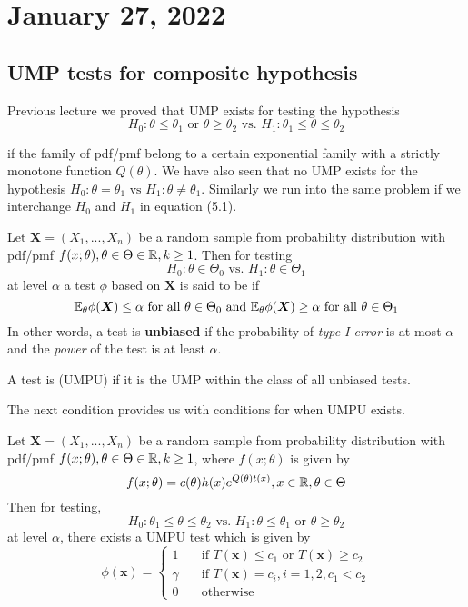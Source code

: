 \section{January 27, 2022}
\subsection{UMP tests for composite hypothesis}
Previous lecture we proved that UMP exists for testing the hypothesis 
\begin{equation}
    H_0: \theta \leq \theta_1 
    \text{ or } \theta \geq \theta_2
    \text{ vs. } H_1: \theta_1 \leq \theta \leq \theta_2
\end{equation}


if the family of pdf/pmf belong to a certain exponential family with a strictly monotone function $Q(\theta)$. 
We have also seen that no UMP exists for the hypothesis
$
H_0: \theta = \theta_1 \text{ vs }
H_1: \theta \neq \theta_1
$. 
Similarly we run into the same problem if we interchange $H_0$ and $H_1$ in equation (5.1).

\begin{definition}
Let $\boldsymbol{X} = (X_1,...,X_n)$ be a random sample from probability distribution with pdf/pmf $f(x;\theta), \theta \in \Theta \in \mathbb R, k \geq 1$. Then for testing
$$
H_0: \theta \in \Theta_0 \text{ vs. }
H_1: \theta \in \Theta_1
$$
at level $\alpha$ a test $\phi$ based on $\boldsymbol{X}$ is said to be  if
$$
\mathbb E_{\theta}\phi(\boldsymbol{X}) \leq \alpha \text{ for all } \theta \in \Theta_0
\text{ and }
\mathbb E_{\theta}\phi(\boldsymbol{X}) \geq \alpha \text{ for all } \theta \in \Theta_1
$$
In other words, a test is \textbf{unbiased} if the probability of \textit{type I error} is at most $\alpha$ and the \textit{power} of the test  is at least $\alpha$. 
\end{definition}

\begin{definition}[UMPU]
A test is  (UMPU) if it is the UMP within the class of all unbiased tests.
\end{definition}
The next condition provides us with conditions for when UMPU exists. 

\begin{theorem}
Let $\boldsymbol{X} = (X_1,...,X_n)$ be a random sample from probability distribution with pdf/pmf $f(x;\theta), \theta \in \Theta \in \mathbb R, k \geq 1$, where $f(x;\theta)$ is given by
$$
f(x;\theta) = c(\theta)h(x)e^{Q(\theta)t(x)}, x \in \mathbb R, \theta \in \Theta
$$
Then for testing,
$$  H_0: \theta_1 \leq \theta \leq \theta_2
    \text{ vs. } H_1:
    \theta \leq \theta_1 
    \text{ or } \theta \geq \theta_2
$$
at level $\alpha$, there exists a UMPU test which is given by 
$$
\phi(\boldsymbol{x}) = 
    \begin{cases}
     1 \quad& \text{if } T(\boldsymbol{x}) \leq c_1 \text{ or }  T(\boldsymbol{x}) \geq c_2 \\
    \gamma & \text{if }  T(\boldsymbol{x}) = c_i, i=1,2, c_1 < c_2 \\
    0  & \text{otherwise}
    \end{cases}
$$
\end{theorem}